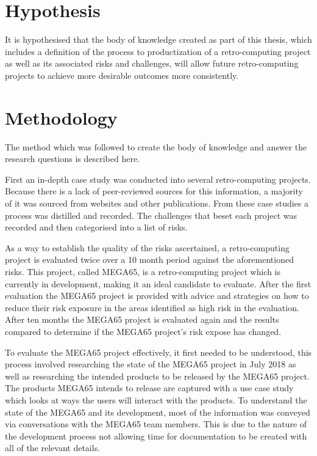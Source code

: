 \section{Hypothesis}
It is hypothesised that the body of knowledge created as part of this thesis, which includes a definition of the process to productization of a retro-computing project as well as its associated risks and challenges, will allow future retro-computing projects to achieve more desirable outcomes more consistently.


\section{Methodology}
The method which was followed to create the body of knowledge and answer the research questions is described here. 

First an in-depth case study was conducted into several retro-computing projects. Because there is a lack of peer-reviewed sources for this information, a majority of it was sourced from websites and other publications. From these case studies a process was distilled and recorded. The challenges that beset each project was recorded and then categorised into a list of risks. 

As a way to establish the quality of the risks ascertained, a retro-computing project is evaluated twice over a 10 month period against the aforementioned risks. This project, called MEGA65, is a retro-computing project which is currently in development, making it an ideal candidate to evaluate. After the first evaluation the MEGA65 project is provided with advice and strategies on how to reduce their risk exposure in the areas identified as high risk in the evaluation. After ten months the MEGA65 project is evaluated again and the results compared to determine if the MEGA65 project's risk expose has changed. 

To evaluate the MEGA65 project effectively, it first needed to be understood, this process involved researching the state of the MEGA65 project in July 2018 as well as researching the intended products to be released by the MEGA65 project. The products MEGA65 intends to release are captured with a use case study which looks at ways the users will interact with the products. To understand the state of the MEGA65 and its development, most of the information was conveyed via conversations with the MEGA65 team members. This is due to the nature of the development process not allowing time for documentation to be created with all of the relevant details. 

